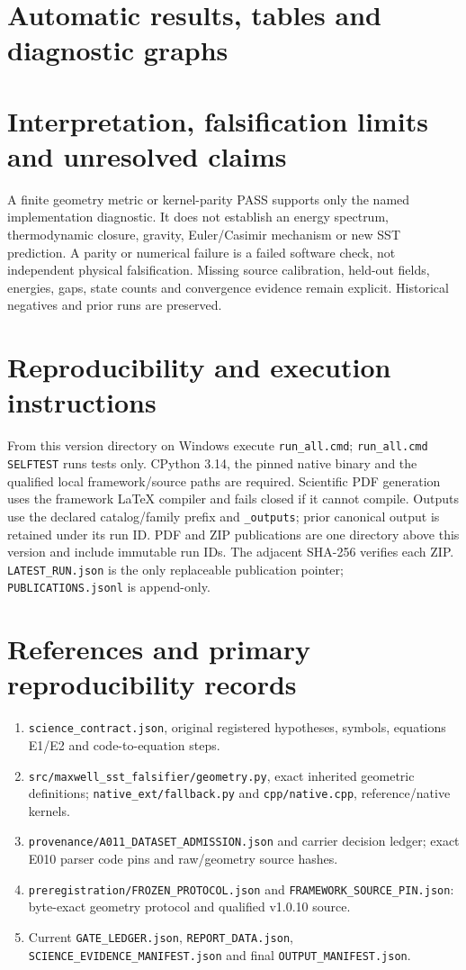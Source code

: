 \documentclass[10pt,a4paper]{article}
\begin{document}
\section{Automatic results, tables and diagnostic graphs}

\section{Interpretation, falsification limits and unresolved claims}
A finite geometry metric or kernel-parity PASS supports only the named implementation diagnostic. It does not establish an energy spectrum, thermodynamic closure, gravity, Euler/Casimir mechanism or new SST prediction. A parity or numerical failure is a failed software check, not independent physical falsification. Missing source calibration, held-out fields, energies, gaps, state counts and convergence evidence remain explicit. Historical negatives and prior runs are preserved.
\section{Reproducibility and execution instructions}
From this version directory on Windows execute \texttt{run\_all.cmd}; \texttt{run\_all.cmd SELFTEST} runs tests only. CPython 3.14, the pinned native binary and the qualified local framework/source paths are required. Scientific PDF generation uses the framework LaTeX compiler and fails closed if it cannot compile. Outputs use the declared catalog/family prefix and \texttt{\_outputs}; prior canonical output is retained under its run ID. PDF and ZIP publications are one directory above this version and include immutable run IDs. The adjacent SHA-256 verifies each ZIP. \texttt{LATEST\_RUN.json} is the only replaceable publication pointer; \texttt{PUBLICATIONS.jsonl} is append-only.
\section{References and primary reproducibility records}
\begin{enumerate}
\item \texttt{science\_contract.json}, original registered hypotheses, symbols, equations E1/E2 and code-to-equation steps.
\item \texttt{src/maxwell\_sst\_falsifier/geometry.py}, exact inherited geometric definitions; \texttt{native\_ext/fallback.py} and \texttt{cpp/native.cpp}, reference/native kernels.
\item \texttt{provenance/A011\_DATASET\_ADMISSION.json} and carrier decision ledger; exact E010 parser code pins and raw/geometry source hashes.
\item \texttt{preregistration/FROZEN\_PROTOCOL.json} and \texttt{FRAMEWORK\_SOURCE\_PIN.json}: byte-exact geometry protocol and qualified v1.0.10 source.
\item Current \texttt{GATE\_LEDGER.json}, \texttt{REPORT\_DATA.json}, \texttt{SCIENCE\_EVIDENCE\_MANIFEST.json} and final \texttt{OUTPUT\_MANIFEST.json}.
\end{enumerate}
\end{document}
